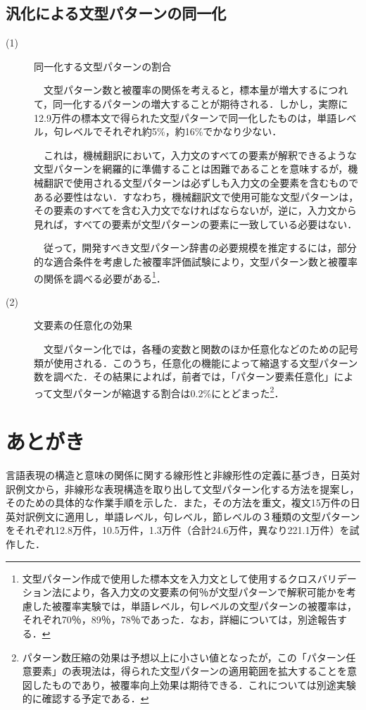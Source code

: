 \documentclass{nlp}
\begin{document}
\subsection{汎化による文型パターンの同一化}
\begin{description}
\item[(1)]同一化する文型パターンの割合

　文型パターン数と被覆率の関係を考えると，標本量が増大するにつれて，同一化するパターンの増大することが期待される．しかし，実際に12.9万件の標本文で得られた文型パターンで同一化したものは，単語レベル，句レベルでそれぞれ約5\%，約16\%でかなり少ない．

　これは，機械翻訳において，入力文のすべての要素が解釈できるような文型パターンを網羅的に準備することは困難であることを意味するが，機械翻訳で使用される文型パターンは必ずしも入力文の全要素を含むものである必要性はない．すなわち，機械翻訳文で使用可能な文型パターンは，その要素のすべてを含む入力文でなければならないが，逆に，入力文から見れば，すべての要素が文型パターンの要素に一致している必要はない．

　従って，開発すべき文型パターン辞書の必要規模を推定するには，部分的な適合条件を考慮した被覆率評価試験により，文型パターン数と被覆率の関係を調べる必要がある\footnote{文型パターン作成で使用した標本文を入力文として使用するクロスバリデーション法により，各入力文の文要素の何％が文型パターンで解釈可能かを考慮した被覆率実験では，単語レベル，句レベルの文型パターンの被覆率は，それぞれ70％，89％，78％であった．なお，詳細については，別途報告する．}．

\item[(2)]文要素の任意化の効果

　文型パターン化では，各種の変数と関数のほか任意化などのための記号類が使用される．このうち，任意化の機能によって縮退する文型パターン数を調べた．その結果によれば，前者では，「パターン要素任意化」によって文型パターンが縮退する割合は0.2\%にとどまった\footnote{パターン数圧縮の効果は予想以上に小さい値となったが，この「パターン任意要素」の表現法は，得られた文型パターンの適用範囲を拡大することを意図したものであり，被覆率向上効果は期待できる．これについては別途実験的に確認する予定である．}．
\end{description}



\section{あとがき}

言語表現の構造と意味の関係に関する線形性と非線形性の定義に基づき，日英対訳例文から，非線形な表現構造を取り出して文型パターン化する方法を提案し，そのための具体的な作業手順を示した．また，その方法を重文，複文15万件の日英対訳例文に適用し，単語レベル，句レベル，節レベルの３種類の文型パターンをそれぞれ12.8万件，10.5万件，1.3万件（合計24.6万件，異なり221.1万件）を試作した．
\end{document}
